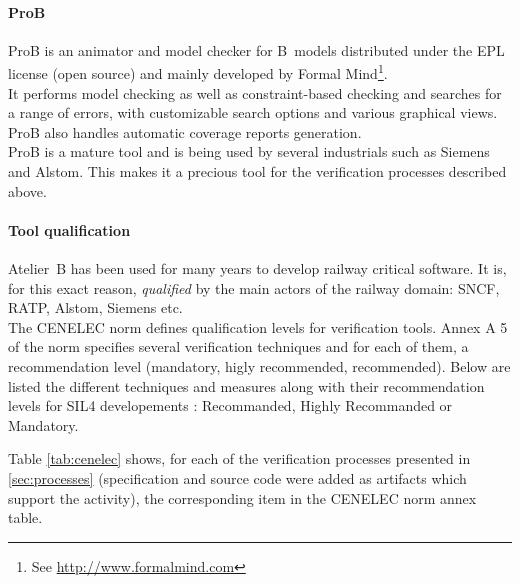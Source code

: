 \paragraph{ProB}
\label{subsec:prob}
ProB is an animator and model checker for B~models distributed under the EPL license (open source) and mainly developed by Formal Mind\footnote{See \url{http://www.formalmind.com}}.\\
It performs model checking as well as constraint-based checking and searches for a range of errors, with customizable search options and various graphical views. ProB also handles automatic coverage reports generation.\\
ProB is a mature tool and is being used by several industrials such as Siemens and Alstom. This makes it a precious tool for the verification processes described above.

\paragraph{Tool qualification}
\label{subsec:qualif}
Atelier~B has been used for many years to develop railway critical software. It is, for this exact reason, {\itshape qualified} by the main actors of the railway domain: SNCF, RATP, Alstom, Siemens etc.\\

The CENELEC norm defines qualification levels for verification tools. Annex A 5 of the norm specifies several verification techniques and for each of them, a recommendation level (mandatory, higly recommended, recommended). Below are listed the different techniques and measures along with their recommendation levels for SIL4 developements : Recommanded, Highly Recommanded or Mandatory.

Table \ref{tab:cenelec} shows, for each of the verification processes presented in \ref{sec:processes} (specification and source code were added as artifacts which support the activity), the corresponding item in the CENELEC norm annex table.

